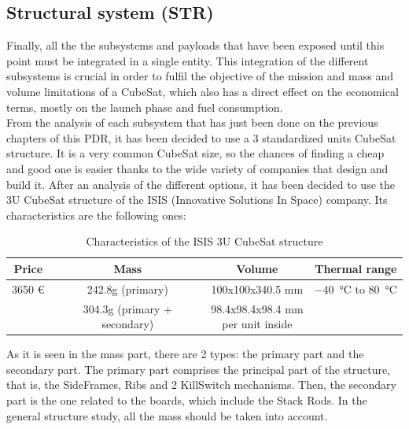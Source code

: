 \subsection{Structural system (STR)}

Finally, all the the subsystems and payloads that have been exposed until this
point must be integrated in a single entity.
This integration of the different subsystems is crucial in order to fulfil the
objective of the mission and mass and volume limitations of a CubeSat, which also
has a direct effect on the economical terms, mostly on the launch phase and fuel
consumption.\\

From the analysis of each subsystem that has just been done on the previous chapters
of this PDR, it has been decided to use a 3 standardized units CubeSat structure.
It is a very common CubeSat size, so the chances of finding a cheap and good one
is easier thanks to the wide variety of companies that design and build it.
After an analysis of the different options, it has been decided to use the 3U
CubeSat structure of the ISIS \cite{3U_structure} (Innovative Solutions In Space) company.
Its characteristics are the following ones:\\

\begin{table}[h!]
	\centering
	\begin{tabular}{c c c c}
		\hline
		Price & Mass & Volume & Thermal range \\ \hline
		3650 \euro & 242.8g (primary) & 100x100x340.5 mm & \SI{-40}{\degreeCelsius} to \SI{80}{\degreeCelsius} \\
		& 304.3g (primary + secondary) & \pbox{5cm}{98.4x98.4x98.4 mm\\ per unit inside} & \\ \hline
	\end{tabular}
	\caption{Characteristics of the ISIS 3U CubeSat structure}
	\label{tab:str}
\end{table}

As it is seen in the mass part, there are 2 types: the primary part and the secondary
part. The primary part comprises the principal part of the structure, that is, the
SideFrames, Ribs and 2 KillSwitch mechanisms. Then, the secondary part is the one
related to the boards, which include the Stack Rods. In the general structure study,
all the mass should be taken into account.\\

